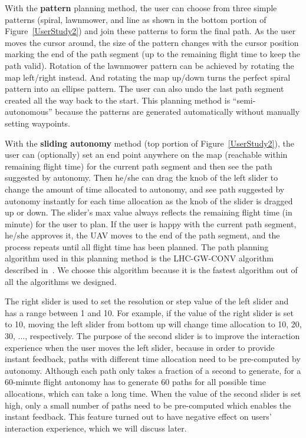 With the \textbf{pattern} planning method, the user can choose from three simple patterns (spiral, lawnmower, and line as shown in the bottom portion of Figure~\ref{UserStudy2}) and join these patterns to form the final path. As the user moves the cursor around, the size of the pattern changes with the cursor position marking the end of the path segment (up to the remaining flight time to keep the path valid). Rotation of the lawnmower pattern can be achieved by rotating the map left/right instead. And rotating the map up/down turns the perfect spiral pattern into an ellipse pattern. The user can also undo the last path segment created all the way back to the start. This planning method is ``semi-autonomous'' because the patterns are generated automatically without manually setting waypoints.

With the \textbf{sliding autonomy} method (top portion of Figure~\ref{UserStudy2}), the user can (optionally) set an end point anywhere on the map (reachable within remaining flight time) for the current path segment and then see the path suggested by autonomy. Then he/she can drag the knob of the left slider to change the amount of time allocated to autonomy, and see path suggested by autonomy instantly for each time allocation as the knob of the slider is dragged up or down. The slider's max value always reflects the remaining flight time (in minute) for the user to plan. If the user is happy with the current path segment, he/she approves it, the UAV moves to the end of the path segment, and the process repeats until all flight time has been planned. The path planning algorithm used in this planning method is the LHC-GW-CONV algorithm described in~\cite{Lin2009UAV, Lin2014Hierarchical}. We choose this algorithm because it is the fastest algorithm out of all the algorithms we designed.

The right slider is used to set the resolution or step value of the left slider and has a range between 1 and 10. For example, if the value of the right slider is set to 10, moving the left slider from bottom up will change time allocation to 10, 20, 30, ..., respectively. The purpose of the second slider is to improve the interaction experience when the user moves the left slider, because in order to provide instant feedback, paths with different time allocation need to be pre-computed by autonomy. Although each path only takes a fraction of a second to generate, for a 60-minute flight autonomy has to generate 60 paths for all possible time allocations, which can take a long time. When the value of the second slider is set high, only a small number of paths need to be pre-computed which enables the instant feedback. This feature turned out to have negative effect on users' interaction experience, which we will discuss later.

